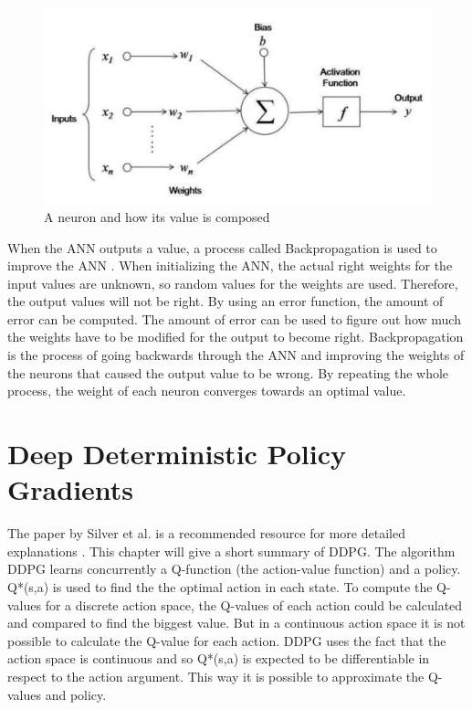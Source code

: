 \begin{figure} [h]	
	\centering
	\includegraphics[width=1\textwidth]{figures/neuron.pdf}
	\caption{A neuron and how its value is composed \cite{neuron.jpeg}}
	\label{neuron}
\end{figure}

\vspace{0.5cm}

When the ANN outputs a value, a process called Backpropagation is used to improve the ANN \cite{backprop}. When initializing the ANN, the actual right weights for the input values are unknown, so random values for the weights are used. Therefore, the output values will not be right. By using an error function, the amount of error can be computed. The amount of error can be used to figure out how much the weights have to be modified for the output to become right. Backpropagation is the process of going backwards through the ANN and improving the weights of the neurons that caused the output value to be wrong. By repeating the whole process, the weight of each neuron converges towards an optimal value. 

\vspace{0.5cm}

\section{Deep Deterministic Policy Gradients}

The paper by Silver et al. is a recommended resource for more detailed explanations \cite{ddpg}. This chapter will give a short summary of DDPG.
The algorithm DDPG learns concurrently a Q-function (the action-value function) and a policy. \cite{ddpg}
Q*(s,a) is used to find the the optimal action in each state.
To compute the Q-values for a discrete action space, the Q-values of each action could be calculated and compared to find the biggest value. But in a continuous action space it is not possible to calculate the Q-value for each action. DDPG uses the fact that the action space is continuous and so Q*(s,a) is expected to be differentiable in respect to the action argument. \cite{ddpg}
This way it is possible to approximate the Q-values and policy.

